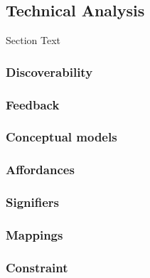 

\subsection{Technical Analysis}

\bigskip
Section Text

\subsubsection{Discoverability}
\medskip

\subsubsection{Feedback}
\medskip

\subsubsection{Conceptual models}
\medskip

\subsubsection{Affordances}
\medskip

\subsubsection{Signifiers}
\medskip

\subsubsection{Mappings}
\medskip


\subsubsection{Constraint }











